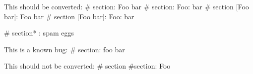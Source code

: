 This should be converted:
# section: Foo bar
# section: Foo: bar
# section [Foo bar]: Foo bar
# section [Foo\: bar]: Foo: bar

# section* : spam eggs

This is a known bug:
# section: foo bar %

This should not be converted:
# section
#section: Foo

